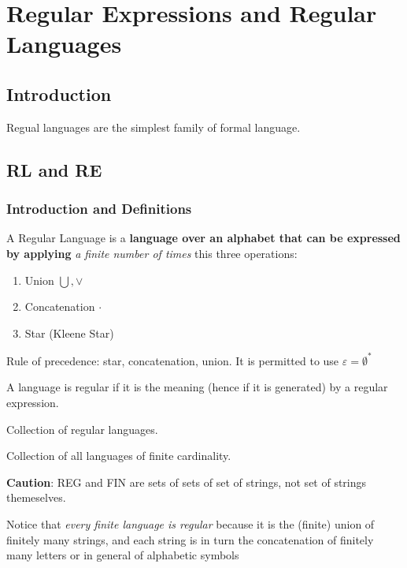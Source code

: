 \chapter{Regular Expressions and Regular Languages}
    \section{Introduction}
        Regual languages are the simplest family of formal language.
    \section{RL and RE}
        \subsection{Introduction and Definitions}
            A Regular Language is a \textbf{language over an alphabet that can be expressed by applying} \emph{a finite number of times} this three operations:
            \begin{enumerate}
                \item Union $\bigcup, \vee$
                \item Concatenation $\cdot$
                \item Star (Kleene Star)
            \end{enumerate}
            Rule of precedence: star, concatenation, union.
            It is permitted to use $\varepsilon = \emptyset^* $
            
            \begin{definition}
                A language is regular  if it is the meaning (hence if it is generated) by a regular expression.
            \end{definition}
            \begin{definition}
                Collection of regular languages.
            \end{definition}
            \begin{definition}
                Collection of all languages of finite cardinality.
            \end{definition}
            \textbf{Caution}: REG and FIN are sets of sets of set of strings, not set of strings themeselves.

            Notice that \emph{every finite language is regular} because it is the (finite)
            union of finitely many strings, and each string is in turn the concatenation
            of finitely many letters or in general of alphabetic symbols

